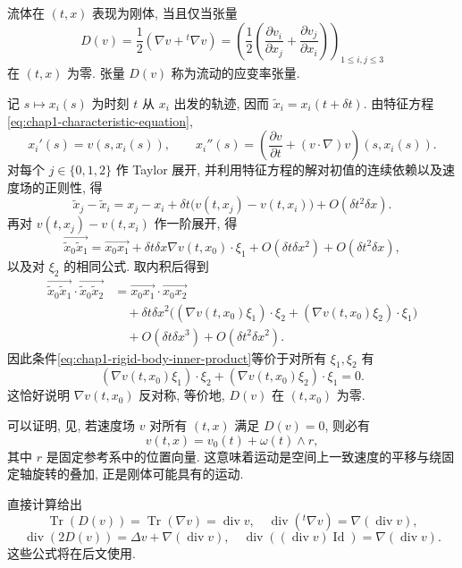 \begin{Proposition}
\label{prop:chap1-strain-rate}
流体在 $(t,x)$ 表现为刚体, 当且仅当张量
\[
  D(v)=\frac12(\nabla v+{}^t\!\nabla v)
  =\left(\frac12\left(\frac{\partial v_i}{\partial x_j}+\frac{\partial v_j}{\partial x_i}\right)\right)_{1\leq i,j\leq3}
\]
在 $(t,x)$ 为零. 张量 $D(v)$ 称为流动的应变率张量.
\end{Proposition}

\begin{Proof}
记 $s\mapsto x_i(s)$ 为时刻 $t$ 从 $x_i$ 出发的轨迹, 因而 $\widetilde x_i=x_i(t+\delta t)$. 由特征方程\eqref{eq:chap1-characteristic-equation},
\[
  x_i'(s)=v(s,x_i(s)),\qquad
  x_i''(s)=\left(\frac{\partial v}{\partial t}+(v\cdot\nabla)v\right)(s,x_i(s)).
\]
对每个 $j\in\{0,1,2\}$ 作 Taylor 展开, 并利用特征方程的解对初值的连续依赖以及速度场的正则性, 得
\[
  \widetilde x_j-\widetilde x_i=x_j-x_i+\delta t\bigl(v(t,x_j)-v(t,x_i)\bigr)+O(\delta t^2\delta x).
\]
再对 $v(t,x_j)-v(t,x_i)$ 作一阶展开, 得
\[
\overrightarrow{\widetilde x_0\widetilde x_1}
=\overrightarrow{x_0x_1}+\delta t\delta x\nabla v(t,x_0)\cdot\xi_1+O(\delta t\delta x^2)+O(\delta t^2\delta x),
\]
以及对 $\xi_2$ 的相同公式. 取内积后得到
\begin{align*}
\overrightarrow{\widetilde x_0\widetilde x_1}\cdot\overrightarrow{\widetilde x_0\widetilde x_2}
&=\overrightarrow{x_0x_1}\cdot\overrightarrow{x_0x_2}\\
&\quad+\delta t\delta x^2\bigl((\nabla v(t,x_0)\xi_1)\cdot\xi_2+(\nabla v(t,x_0)\xi_2)\cdot\xi_1\bigr)\\
&\quad+O(\delta t\delta x^3)+O(\delta t^2\delta x^2).
\end{align*}
因此条件\eqref{eq:chap1-rigid-body-inner-product}等价于对所有 $\xi_1,\xi_2$ 有
\[
  (\nabla v(t,x_0)\xi_1)\cdot\xi_2+(\nabla v(t,x_0)\xi_2)\cdot\xi_1=0.
\]
这恰好说明 $\nabla v(t,x_0)$ 反对称, 等价地, $D(v)$ 在 $(t,x_0)$ 为零.
\end{Proof}

\begin{Remark}
\label{rem:chap1-rigid-velocity-field}
可以证明, 见, 若速度场 $v$ 对所有 $(t,x)$ 满足 $D(v)=0$, 则必有
\[
  v(t,x)=v_0(t)+\omega(t)\wedge r,
\]
其中 $r$ 是固定参考系中的位置向量. 这意味着运动是空间上一致速度的平移与绕固定轴旋转的叠加, 正是刚体可能具有的运动.
\end{Remark}

\begin{Remark}
\label{rem:chap1-strain-rate-identities}
直接计算给出
\[
\operatorname{Tr}(D(v))=\operatorname{Tr}(\nabla v)=\operatorname{div}v,
\quad \operatorname{div}({}^t\!\nabla v)=\nabla(\operatorname{div}v),
\]
\[
\operatorname{div}(2D(v))=\Delta v+\nabla(\operatorname{div}v),
\quad \operatorname{div}((\operatorname{div}v)\operatorname{Id})=\nabla(\operatorname{div}v).
\]
这些公式将在后文使用.
\end{Remark}

